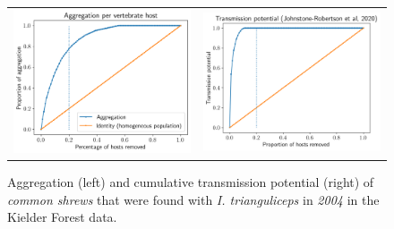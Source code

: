 \documentclass{article}
\begin{document}
\begin{figure}[]
	\begin{mdframed}[backgroundcolor=grey250,rightline=false,leftline=false,topline=false]
	\centering
	\begin{tabular}{ll}
		\includegraphics[width=.48\linewidth,valign=m]{lorenz_aggregation_SA_2004_I.Trianguliceps} & \includegraphics[width=.48\linewidth,valign=m]{lorenz_JR_SA_2004_I.Trianguliceps} \\
	\end{tabular}
	\caption{Aggregation (left) and cumulative transmission potential (right) of \textit{common shrews} that were found with \textit{I. trianguliceps} in \textit{2004} in the Kielder Forest data.}
	\label{fig:lorenz_2004_itrianguliceps_SA}
	\end{mdframed}
\end{figure}
\end{document}
